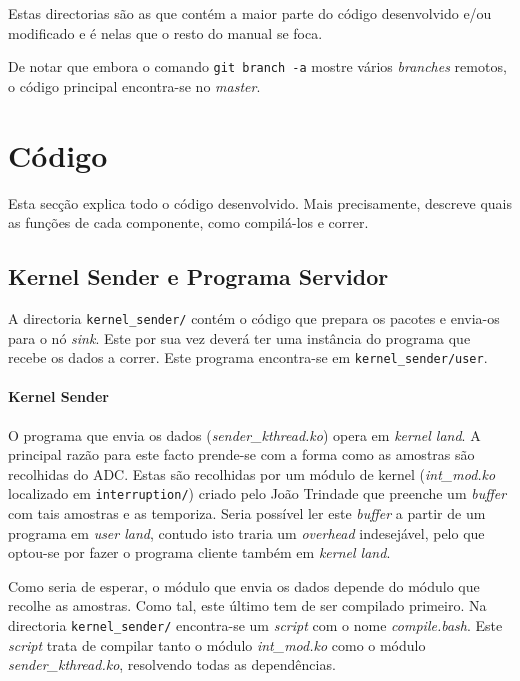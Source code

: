 \documentclass[10pt,a4paper,oneside]{book}
\begin{document}
Estas directorias são as que contém a maior parte do código desenvolvido e/ou modificado e é nelas que o resto do manual se foca.

De notar que embora o comando {\tt git branch -a} mostre vários \emph{branches} remotos, o código principal encontra-se no \emph{master}.

\chapter{Código}

 Esta secção explica todo o código desenvolvido. Mais precisamente, descreve quais as funções de cada componente, como compilá-los e correr.

  \section{Kernel Sender e Programa Servidor}
  
  A directoria {\tt kernel\_sender/} contém o código que prepara os pacotes e envia-os para o nó \emph{sink}. Este por sua vez deverá ter uma instância do programa que recebe os dados a correr. Este programa encontra-se em {\tt kernel\_sender/user}.

  \subsubsection{Kernel Sender}\label{sec:sender}

    O programa que envia os dados (\emph{sender\_kthread.ko}) opera em \emph{kernel land}. A principal razão para este facto prende-se com a forma como as amostras são recolhidas do ADC. Estas são recolhidas por um módulo de kernel (\emph{int\_mod.ko} localizado em {\tt interruption/}) criado pelo João Trindade que preenche um \emph{buffer} com tais amostras e as temporiza. Seria possível ler este \emph{buffer} a partir de um programa em \emph{user land}, contudo isto traria um \emph{overhead} indesejável, pelo que optou-se por fazer o programa cliente também em \emph{kernel land}.

    Como seria de esperar, o módulo que envia os dados depende do módulo que recolhe as amostras. Como tal, este último tem de ser compilado primeiro. Na directoria {\tt kernel\_sender/} encontra-se um \emph{script} com o nome \emph{compile.bash}. Este \emph{script} trata de compilar tanto o módulo \emph{int\_mod.ko} como o módulo \emph{sender\_kthread.ko}, resolvendo todas as dependências.
\end{document}
